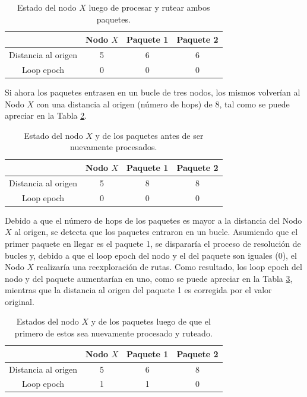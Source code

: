 \begin{table}[]
    \centering
    \begin{tabular}{|c|c|c|c|}
        \hline
        & Nodo $X$ & Paquete 1 & Paquete 2 \\
        \hline
        Distancia al origen & 5 & 6 & 6 \\
        \hline
        Loop epoch & 0 & 0 & 0 \\
        \hline
    \end{tabular}
    \caption{Estado del nodo $X$ luego de procesar y rutear ambos paquetes.}
    \label{tab:loop-epoch-2}
\end{table}

Si ahora los paquetes entrasen en un bucle de tres nodos, los mismos volverían al Nodo $X$ con una distancia al origen (número de hops) de 8, tal como se puede apreciar en la Tabla \ref{tab:loop-epoch-3}.

\begin{table}[]
    \centering
    \begin{tabular}{|c|c|c|c|}
        \hline
        & Nodo $X$ & Paquete 1 & Paquete 2 \\
        \hline
        Distancia al origen & 5 & 8 & 8 \\
        \hline
        Loop epoch & 0 & 0 & 0 \\
        \hline
    \end{tabular}
    \caption{Estado del nodo $X$ y de los paquetes antes de ser nuevamente procesados.}
    \label{tab:loop-epoch-3}
\end{table}

Debido a que el número de hops de los paquetes es mayor a la distancia del Nodo $X$ al origen, se detecta que los paquetes entraron en un bucle. Asumiendo que el primer paquete en llegar es el paquete 1, se dispararía el proceso de resolución de bucles y, debido a que el loop epoch del nodo y el del paquete son iguales (0), el Nodo $X$ realizaría una reexploración de rutas. Como resultado, los loop epoch del nodo y del paquete aumentarían en uno, como se puede apreciar en la Tabla \ref{tab:loop-epoch-4}, mientras que la distancia al origen del paquete 1 es corregida por el valor original.

\begin{table}[]
    \centering
    \begin{tabular}{|c|c|c|c|}
        \hline
        & Nodo $X$ & Paquete 1 & Paquete 2 \\
        \hline
        Distancia al origen & 5 & 6 & 8 \\
        \hline
        Loop epoch & 1 & 1 & 0 \\
        \hline
    \end{tabular}
    \caption{Estados del nodo $X$ y de los paquetes luego de que el primero de estos sea nuevamente procesado y ruteado.}
    \label{tab:loop-epoch-4}
\end{table}


